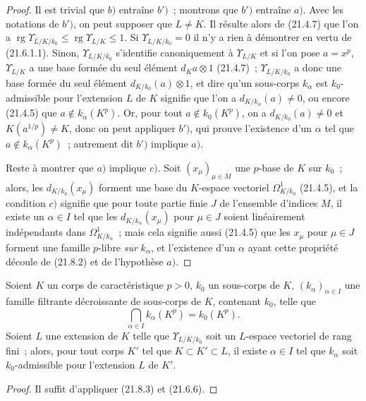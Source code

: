 \begin{proof}
Il est trivial que $b)$ entraîne $b')$~; montrons que $b')$ entraîne $a)$.
Avec les notations de $b')$, on peut supposer que $L\ne K$. Il résulte alors
de (21.4.7) que l'on a $\operatorname{rg}\Upsilon_{L/K/k_0}\leqslant\operatorname{rg}\Upsilon_{L/K}\leqslant1$. Si
$\Upsilon_{L/K/k_0}=0$ il n'y a rien à démontrer en vertu de
(21.6.1.1). Sinon, $\Upsilon_{L/K/k_0}$ s'identifie canoniquement à
$\Upsilon_{L/K}$ et si l'on pose $a=x^p$, $\Upsilon_{L/K}$ a une base
formée du seul élément $d_Ka\otimes1$ (21.4.7)~;
$\Upsilon_{L/K/k_0}$ a donc une base formée du seul élément
$d_{K/k_0}(a)\otimes1$, et dire qu'un sous-corps $k_\alpha$ est
$k_0$-admissible pour l'extension $L$ de $K$ signifie que l'on a
$d_{K/k_\alpha}(a)\ne0$, ou encore (21.4.5) que
$a\notin k_\alpha(K^p)$. Or, pour tout $a\notin k_0(K^p)$, on a
$d_{K/k_0}(a)\ne0$ et $K(a^{1/p})\ne K$, donc on peut appliquer $b')$, qui
prouve l'existence d'un $\alpha$ tel que $a\notin k_\alpha(K^p)$~;
autrement dit $b')$ implique $a)$.

Reste à montrer que $a)$ implique $c)$. Soit $(x_\mu)_{\mu\in M}$ une
$p$-base de $K$ sur $k_0$~; alors, les $d_{K/k_0}(x_\mu)$ forment une base du
$K$-espace vectoriel $\Omega^1_{K/k_0}$ (21.4.5), et la condition $c)$
signifie que pour toute partie finie $J$ de l'ensemble d'indices $M$, il
existe un $\alpha\in I$ tel que les $d_{K/k_\alpha}(x_\mu)$ pour $\mu\in J$
soient linéairement indépendants dans $\Omega^1_{K/k_\alpha}$~; mais cela
signifie aussi (21.4.5) que les $x_\mu$ pour $\mu\in J$ forment une famille
$p$-libre \emph{sur} $k_\alpha$, et l'existence d'un $\alpha$ ayant cette propriété
découle de (21.8.2) et de l'hypothèse $a)$.
\end{proof}

\begin{corollary}[21.8.4]
\label{0.21.8.4-fr}
Soient $K$ un corps de caractéristique $p>0$, $k_0$ un sous-corps de $K$,
$(k_\alpha)_{\alpha\in I}$ une famille filtrante décroissante de sous-corps
de $K$, contenant $k_0$, telle que
\[
  \bigcap_{\alpha\in I}k_\alpha(K^p)=k_0(K^p).
\]
Soient $L$ une extension de $K$ telle que $\Upsilon_{L/K/k_0}$ soit un
$L$-espace vectoriel de rang fini~; alors, pour tout corps $K'$ tel que
$K\subset K'\subset L$, il existe $\alpha\in I$ tel que $k_\alpha$ soit
$k_0$-admissible pour l'extension $L$ de $K'$.
\end{corollary}

\begin{proof}
Il suffit d'appliquer (21.8.3) et (21.6.6).
\end{proof}

